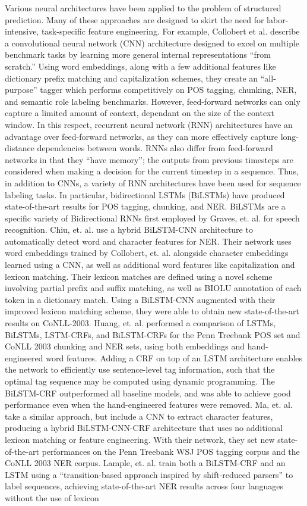 \documentclass{acm_proc_article-sp}
\begin{document}
Various neural architectures have been applied to the problem of structured prediction. Many of these approaches are designed to skirt the need for labor-intensive, task-specific feature engineering. For example, Collobert et al. \cite{collobert2011natural} describe a convolutional neural network (CNN) architecture designed to excel on multiple benchmark tasks by learning more general internal representations “from scratch.” Using word embeddings, along with a few additional features like dictionary prefix matching and capitalization schemes, they create an “all-purpose” tagger which performs competitively on POS tagging, chunking, NER, and semantic role labeling benchmarks. However, feed-forward networks can only capture a limited amount of context, dependant on the size of the context window. In this respect, recurrent neural network (RNN) architectures have an advantage over feed-forward networks, as they can more effectively capture long-distance dependencies between words. RNNs also differ from feed-forward networks in that they “have memory”; the outputs from previous timesteps are considered when making a decision for the current timestep in a sequence. Thus, in addition to CNNs, a variety of RNN architectures have been used for sequence labeling tasks. In particular, bidirectional LSTMs (BiLSTMs) have produced state-of-the-art results for POS tagging, chunking, and NER. BiLSTMs are a specific variety of Bidirectional RNNs first employed by Graves, et. al. for speech recognition. \cite{graves2013hybrid} Chiu, et. al. use a hybrid BiLSTM-CNN architecture to automatically detect word and character features for NER. \cite{chiu2015named} Their network uses word embeddings trained by Collobert, et. al. alongside character embeddings learned using a CNN, as well as additional word features like capitalization and lexicon matching. Their lexicon matches are defined using a novel scheme involving partial prefix and suffix matching, as well as BIOLU annotation of each token in a dictionary match. Using a BiLSTM-CNN augmented with their improved lexicon matching scheme, they were able to obtain new state-of-the-art results on CoNLL-2003. Huang, et. al. performed a comparison of LSTMs, BiLSTMs, LSTM-CRFs, and BiLSTM-CRFs for the Penn Treebank POS set and CoNLL 2003 chunking and NER sets, using both embeddings and hand-engineered word features. \cite{huang2015bidirectional} Adding a CRF on top of an LSTM architecture enables the network to efficiently use sentence-level tag information, such that the optimal tag sequence may be computed using dynamic programming. The BiLSTM-CRF outperformed all baseline models, and was able to achieve good performance even when the hand-engineered features were removed. Ma, et. al. take a similar approach, but include a CNN to extract character features, producing a hybrid BiLSTM-CNN-CRF architecture that uses no additional lexicon matching or feature engineering. \cite{ma2016end} With their network, they set new state-of-the-art performances on the Penn Treebank WSJ POS tagging corpus and the CoNLL 2003 NER corpus. Lample, et. al. train both a BiLSTM-CRF and an LSTM using a “transition-based approach inspired by shift-reduced parsers” to label sequences, achieving state-of-the-art NER results across four languages without the use of lexicon 
\end{document}
